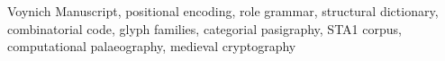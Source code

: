 Voynich Manuscript, positional encoding, role grammar, structural dictionary, combinatorial code, glyph families, categorial pasigraphy, STA1 corpus, computational palaeography, medieval cryptography

